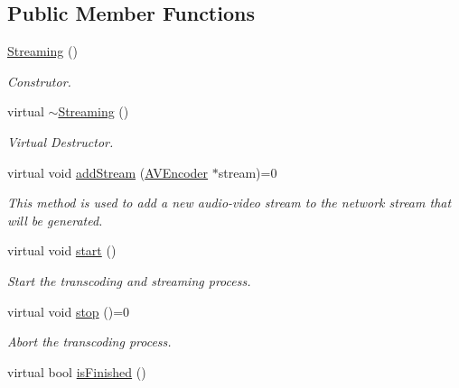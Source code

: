 \subsection*{Public Member Functions}
\begin{DoxyCompactItemize}
\item 
\hyperlink{classbr_1_1ufscar_1_1lince_1_1streaming_1_1Streaming_a91b9b728a05fdb56d4f86b7a1c9aceee}{Streaming} ()
\begin{DoxyCompactList}\small\item\em Construtor. \item\end{DoxyCompactList}\item 
virtual \hyperlink{classbr_1_1ufscar_1_1lince_1_1streaming_1_1Streaming_a5723d35392013df85a778df59683aab4}{$\sim$Streaming} ()
\begin{DoxyCompactList}\small\item\em Virtual Destructor. \item\end{DoxyCompactList}\item 
virtual void \hyperlink{classbr_1_1ufscar_1_1lince_1_1streaming_1_1Streaming_ab2739b46d9bd285d4d64100b9d5bb796}{addStream} (\hyperlink{classbr_1_1ufscar_1_1lince_1_1streaming_1_1AVEncoder}{AVEncoder} $\ast$stream)=0
\begin{DoxyCompactList}\small\item\em This method is used to add a new audio-\/video stream to the network stream that will be generated. \item\end{DoxyCompactList}\item 
virtual void \hyperlink{classbr_1_1ufscar_1_1lince_1_1streaming_1_1Streaming_a00e16bac644283a701a392039ee43f25}{start} ()
\begin{DoxyCompactList}\small\item\em Start the transcoding and streaming process. \item\end{DoxyCompactList}\item 
virtual void \hyperlink{classbr_1_1ufscar_1_1lince_1_1streaming_1_1Streaming_a6fa79a5e9bac37069e91d77be9ef4a54}{stop} ()=0
\begin{DoxyCompactList}\small\item\em Abort the transcoding process. \item\end{DoxyCompactList}\item 
virtual bool \hyperlink{classbr_1_1ufscar_1_1lince_1_1streaming_1_1Streaming_ab9859ece4030fe9bf46416a5508f7a0c}{isFinished} ()

\end{DoxyCompactItemize}
